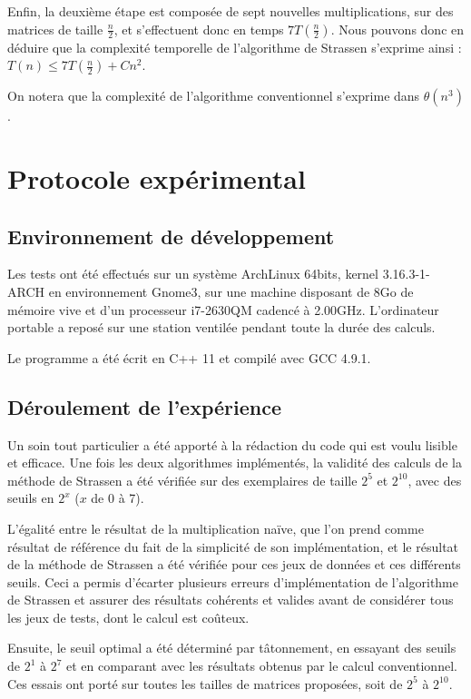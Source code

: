 \documentclass[10pt,a4paper]{article}
\begin{document}
Enfin, la deuxième étape est composée de sept nouvelles multiplications, sur des matrices de taille $ \frac{n}{2} $, et s'effectuent donc en temps $ 7T( \frac{n}{2}) $. Nous pouvons donc en déduire que la complexité temporelle de l'algorithme de Strassen s'exprime ainsi : $ T(n) \leq 7T( \frac{n}{2}) + Cn^{2} $.

On notera que la complexité de l'algorithme conventionnel s'exprime dans $ \theta (n^{3}) $.

\section{Protocole expérimental}

\subsection{Environnement de développement}

Les tests ont été effectués sur un système ArchLinux 64bits, kernel 3.16.3-1-ARCH en environnement Gnome3, sur une machine disposant de 8Go de mémoire vive et d'un processeur i7-2630QM cadencé à 2.00GHz. L'ordinateur portable a reposé sur une station ventilée pendant toute la durée des calculs.

Le programme a été écrit en C++ 11 et compilé avec GCC 4.9.1.

\subsection{Déroulement de l'expérience}

Un soin tout particulier a été apporté à la rédaction du code qui est voulu lisible et efficace. Une fois les deux algorithmes implémentés, la validité des calculs de la méthode de Strassen a été vérifiée sur des exemplaires de taille $ 2^{5} $ et $ 2^{10} $, avec des seuils en $ 2^{x} $ ($ x $ de 0 à 7).

L'égalité entre le résultat de la multiplication naïve, que l'on prend comme résultat de référence du fait de la simplicité de son implémentation, et le résultat de la méthode de Strassen a été vérifiée pour ces jeux de données et ces différents seuils. Ceci a permis d'écarter plusieurs erreurs d'implémentation de l'algorithme de Strassen et assurer des résultats cohérents et valides avant de considérer tous les jeux de tests, dont le calcul est coûteux.

Ensuite, le seuil optimal a été déterminé par tâtonnement, en essayant  des seuils de $ 2^{1} $ à $ 2^{7} $ et en comparant avec les résultats obtenus par le calcul conventionnel. Ces essais ont porté sur toutes les tailles de matrices proposées, soit de $ 2^{5} $ à $ 2^{10} $.
\end{document}
